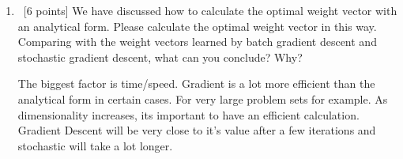 \documentclass[12pt, fullpage,letterpaper]{article}
\begin{document}
\begin{enumerate}
\begin{enumerate}
		\item~[6 points] We have discussed how to  calculate the optimal weight vector with an analytical form. Please calculate the optimal weight vector in this way. Comparing with the  weight vectors learned by batch gradient descent and stochastic gradient descent, what can you conclude? Why? \newline

The biggest factor is time/speed. Gradient is a lot more efficient than the analytical form in certain cases. For very large problem sets for example. As dimensionality increases, its important to have an efficient calculation. Gradient Descent will be very close to it's value after a few iterations and stochastic will take a lot longer. 
	\end{enumerate}

\end{enumerate}
\end{document}
